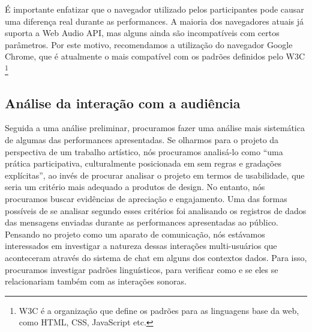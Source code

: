 É importante enfatizar que o navegador utilizado pelos participantes pode causar uma diferença real durante as performances. A maioria dos navegadores atuais já suporta a Web Audio API, mas alguns ainda são incompatíveis com certos parâmetros. Por este motivo, recomendamos a utilização do navegador Google Chrome, que é atualmente o mais compatível com os padrões definidos pelo W3C \footnote{W3C é a organização que define os padrões para as linguagens base da web, como HTML, CSS, JavaScript etc.}


%


\subsection{Análise da interação com a audiência}

Seguida a uma análise preliminar, procuramos fazer uma análise mais sistemática de algumas das performances apresentadas. Se olharmos para o projeto da perspectiva de um trabalho artístico, nós procuramos analisá-lo como ``uma prática participativa, culturalmente posicionada em sem regras e gradações explícitas''\cite{McCullough1998}, ao invés de procurar analisar o projeto em termos de usabilidade, que seria um critério mais adequado a produtos de design. No entanto, nós procuramos buscar evidências de apreciação e engajamento. Uma das formas possíveis de se analisar segundo esses critérios foi analisando os registros de dados das mensagens enviadas durante as performances apresentadas ao público. Pensando no projeto como um aparato de comunicação, nós estávamos interessados em investigar a natureza dessas interações multi-usuários que aconteceram através do sistema de chat em alguns dos contextos dados. Para isso, procuramos investigar padrões linguísticos, para verificar como e se eles se relacionariam também com as interações sonoras.



